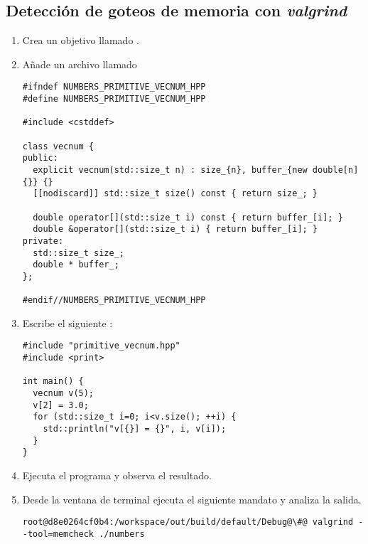 \subsection{Detección de goteos de memoria con \emph{valgrind}}

\begin{enumerate}

\item
Crea un objetivo llamado .

\item Añade un archivo llamado 

\begin{lstlisting}
#ifndef NUMBERS_PRIMITIVE_VECNUM_HPP
#define NUMBERS_PRIMITIVE_VECNUM_HPP

#include <cstddef>

class vecnum {
public:
  explicit vecnum(std::size_t n) : size_{n}, buffer_{new double[n]{}} {}
  [[nodiscard]] std::size_t size() const { return size_; }

  double operator[](std::size_t i) const { return buffer_[i]; }
  double &operator[](std::size_t i) { return buffer_[i]; }
private:
  std::size_t size_;
  double * buffer_;
};

#endif//NUMBERS_PRIMITIVE_VECNUM_HPP
\end{lstlisting}

\item
Escribe el siguiente :

\begin{lstlisting}
#include "primitive_vecnum.hpp"
#include <print>

int main() {
  vecnum v(5);
  v[2] = 3.0;
  for (std::size_t i=0; i<v.size(); ++i) {
    std::println("v[{}] = {}", i, v[i]);
  }
}
\end{lstlisting}

\item
Ejecuta el programa y observa el resultado.

\item
Desde la ventana de terminal ejecuta el siguiente mandato y analiza la salida.

\begin{lstlisting}[style=terminal,escapechar=@]
root@d8e0264cf0b4:/workspace/out/build/default/Debug@\#@ valgrind --tool=memcheck ./numbers
\end{lstlisting}

\end{enumerate}
